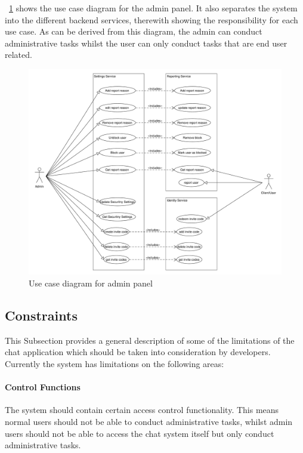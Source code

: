 ~\ref{fig:figure5} shows the use case diagram for the admin panel.
It also separates the system into the different backend services, therewith showing the responsibility for each use
case.
As can be derived from this diagram, the admin can conduct administrative tasks whilst the user can only conduct tasks
that are end user related.

\begin{figure}[h]
    \centering
    \includegraphics[width=1.0\textwidth]{./graphics/UseCaseDiagramAdminPanel}
    \caption{Use case diagram for admin panel}
    \label{fig:figure5}
\end{figure}

\subsection{Constraints}

This Subsection provides a general description of some of the limitations of the chat application which should be taken
into consideration by developers.
Currently the system has limitations on the following areas:

\paragraph{Control Functions}
The system should contain certain access control functionality.
This means normal users should not be able to conduct administrative tasks, whilst admin users should not be able to
access the chat system itself but only conduct administrative tasks.

